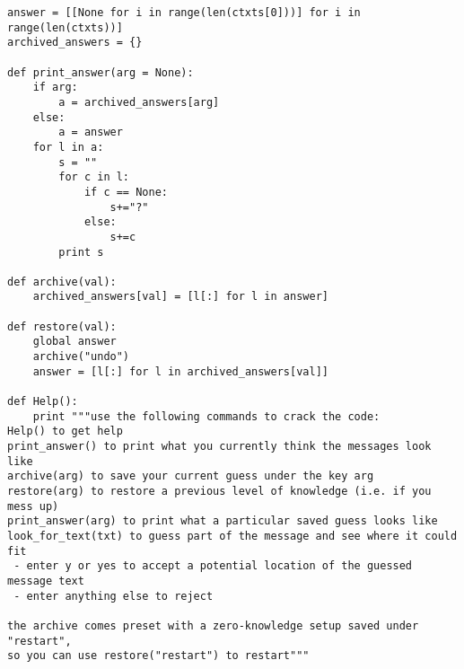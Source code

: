 \documentclass[11pt]{article}
\begin{document}
\begin{verbatim}
answer = [[None for i in range(len(ctxts[0]))] for i in range(len(ctxts))]
archived_answers = {}

def print_answer(arg = None):
    if arg:
        a = archived_answers[arg]
    else:
        a = answer
    for l in a:
        s = ""
        for c in l:
            if c == None:
                s+="?"
            else:
                s+=c
        print s

def archive(val):
    archived_answers[val] = [l[:] for l in answer]

def restore(val):
    global answer
    archive("undo")
    answer = [l[:] for l in archived_answers[val]]

def Help():
    print """use the following commands to crack the code:
Help() to get help
print_answer() to print what you currently think the messages look like
archive(arg) to save your current guess under the key arg
restore(arg) to restore a previous level of knowledge (i.e. if you mess up)
print_answer(arg) to print what a particular saved guess looks like
look_for_text(txt) to guess part of the message and see where it could fit
 - enter y or yes to accept a potential location of the guessed message text
 - enter anything else to reject

the archive comes preset with a zero-knowledge setup saved under "restart", 
so you can use restore("restart") to restart"""


\end{verbatim}
\end{document}
